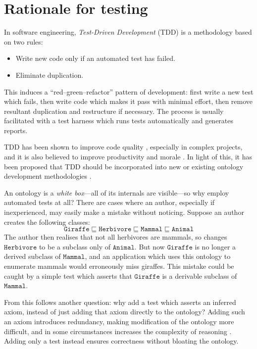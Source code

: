 \documentclass[paper.tex]{subfiles}
\begin{document}
\section{Rationale for testing}
\label{sec:rationale}

In software engineering, \emph{Test-Driven Development} (TDD) \cite{Beck:TDD} is a methodology based on two rules:
\begin{itemize}[nosep]
  \item Write new code only if an automated test has failed.
  \item Eliminate duplication.
\end{itemize}
This induces a ``red--green--refactor'' pattern of development: first write a new test which fails, then write code which makes it pass with minimal effort, then remove resultant duplication and restructure if necessary.
The process is usually facilitated with a test harness which runs tests automatically and generates reports.

TDD has been shown to improve code quality \cite{Rafique:TDD}, especially in complex projects, and it is also believed to improve productivity and morale \cite{Beck:TDD}.
In light of this, it has been proposed that TDD should be incorporated into new or existing ontology development methodologies \cite{Keet:TDDOntologies}.

An ontology is a \emph{white box}---all of its internals are visible---so why employ automated tests at all?  There are cases where an author, especially if inexperienced, may easily make a mistake without noticing.
Suppose an author creates the following classes:
\[ \mathtt{Giraffe} \sqsubseteq \mathtt{Herbivore} \sqsubseteq \mathtt{Mammal} \sqsubseteq \mathtt{Animal} \]
The author then realises that not all herbivores are mammals, so changes $\mathtt{Herbivore}$ to be a subclass only of $\mathtt{Animal}$.
But now $\mathtt{Giraffe}$ is no longer a derived subclass of $\mathtt{Mammal}$, and an application which uses this ontology to enumerate mammals would erroneously miss giraffes.
This mistake could be caught by a simple test which asserts that $\mathtt{Giraffe}$ is a derivable subclass of $\mathtt{Mammal}$.

From this follows another question: why add a test which asserts an inferred axiom, instead of just adding that axiom directly to the ontology?  Adding such an axiom introduces redundancy, making modification of the ontology more difficult, and in some circumstances increases the complexity of reasoning \cite{Vrandecic:UnitTestsOntologies}.
Adding only a test instead ensures correctness without bloating the ontology.
\end{document}
